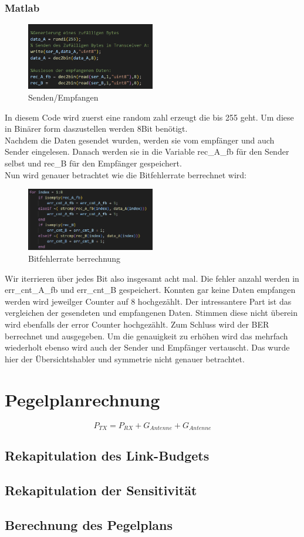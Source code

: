 \subsubsection{Matlab}
\begin{figure}[H]
    \centering
    \includegraphics[width=0.5\textwidth]{Pictures/einlesenMatlab.png}
    \caption{Senden/Empfangen}
    \label{fig:matlab_example}
\end{figure}
In diesem Code wird zuerst eine random zahl erzeugt die bis 255 geht.
Um diese in Binärer form daszustellen werden 8Bit benötigt.
\\
Nachdem die Daten gesendet wurden, werden sie vom empfänger und auch Sender eingelesen.
Danach werden sie in die Variable rec\_A\_fb für den Sender selbst und rec\_B für den Empfänger gespeichert.
\\
Nun wird genauer betrachtet wie die Bitfehlerrate berrechnet wird:
\begin{figure}[H]
    \centering
    \includegraphics[width=0.5\textwidth]{Pictures/vergleich.png}
    \caption{Bitfehlerrate berrechnung}
    \label{fig:bitfehler}
\end{figure}
Wir iterrieren über jedes Bit also insgesamt acht mal.
Die fehler anzahl werden in err\_cnt\_A\_fb und err\_cnt\_B gespeichert.
Konnten gar keine Daten empfangen werden wird jeweilger Counter auf 8 hochgezählt.
Der intressantere Part ist das vergleichen der gesendeten und empfangenen Daten.
Stimmen diese nicht überein wird ebenfalls der error Counter hochgezählt.
Zum Schluss wird der BER berrechnet und ausgegeben.
Um die genauigkeit zu erhöhen wird das mehrfach wiederholt ebenso wird auch der Sender und Empfänger vertauscht.
Das wurde hier der Übersichtshabler und symmetrie nicht genauer betrachtet.



\section{Pegelplanrechnung}
\begin{equation}
    P_{TX} = P_{RX} + G_{Antenne} + G_{Antenne}
\end{equation}
\subsection{Rekapitulation des Link-Budgets}
\subsection{Rekapitulation der Sensitivität}
\subsection{Berechnung des Pegelplans}